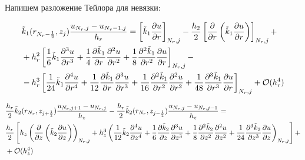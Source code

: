 Напишем разложение Тейлора для невязки:

\begin{align*}
  &\Tilde{k}_1(r_{N_r-\frac{1}{2}}, z_j) \frac{u_{N_r, j} - u_{N_r - 1, j}}{h_{r}} =
  \left[ \Tilde{k}_1 \frac{\partial u}{\partial r} \right]_{N_r, j}
  - \frac{h_2}{2} \left[ \frac{\partial }{\partial r} \left( \Tilde{k}_1 \frac{\partial u}{\partial r} \right) \right]_{N_r, j} + \\
  & + h^2_r \left[
    \frac{1}{6} \Tilde{k}_1 \frac{\partial^3 u}{\partial r^3} +
    \frac{1}{4} \frac{\partial \Tilde{k}_1}{\partial r} \frac{\partial^2 u}{\partial r^2} +
    \frac{1}{8} \frac{\partial^2 \Tilde{k}_1}{\partial r^2} \frac{\partial u}{\partial r}
   \right]_{N_r, j} -\\
  &- h^3_r \left[ 
    \frac{1}{24} \Tilde{k}_1 \frac{\partial^4 u}{\partial r^4} +
    \frac{1}{12} \frac{\partial \Tilde{k}_1}{\partial r} \frac{\partial^3 u}{\partial r^3} +
    \frac{1}{16} \frac{\partial^2 \Tilde{k}_1}{\partial r^2} \frac{\partial^2 u}{\partial r^2} +
    \frac{1}{48} \frac{\partial^3 \Tilde{k}_1}{\partial r^3} \frac{\partial u}{\partial r}
  \right]_{N_r, j} + \mathcal{O}(h^4_r)
\end{align*}

\begin{align*}
  &\frac{h_r}{2} \Tilde{k}_2(r_{N_r}, z_{j+\frac{1}{2}}) \frac{u_{N_r, j + 1} - u_{N_r, j}}{h_{z}}
  - \frac{h_r}{2} \Tilde{k}_2(r_{N_r}, z_{j-\frac{1}{2}}) \frac{u_{N_r, j} - u_{N_r, j - 1}}{h_z} = \\
  &\frac{h_r}{2} \left[
    h_z \left(\frac{\partial}{\partial z} \left( \Tilde{k}_2 \frac{\partial u}{\partial z} \right) \right)_{N_r, j}
    + h^3_z \left( 
      \frac{1}{12} \Tilde{k}_2 \frac{\partial^4 u}{\partial z^4} +
      \frac{1}{6} \frac{\partial \Tilde{k}_2}{\partial z} \frac{\partial^3 u}{\partial z^3} +
      \frac{1}{8} \frac{\partial^2 \Tilde{k}_2}{\partial z^2} \frac{\partial^2 u}{\partial z^2} +
      \frac{1}{24} \frac{\partial^3 \Tilde{k}_2}{\partial z^3} \frac{\partial u}{\partial z}
    \right)_{N_r, j}
   \right] +\\
   & + \mathcal{O}(h^4_z)
\end{align*}

